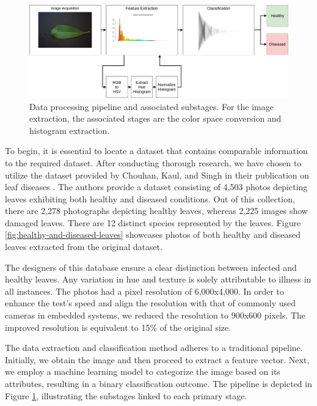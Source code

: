 \begin{figure}[h!]
    \centering
    \includegraphics[width=.9\linewidth]{Figures/pipeline.png}
    \caption{Data processing pipeline and associated substages. For the image extraction, the associated stages are the color space conversion and histogram extraction.}
    \label{fig:pipeline}
\end{figure}

To begin, it is essential to locate a dataset that contains comparable information to the required dataset. After conducting thorough research, we have chosen to utilize the dataset provided by Chouhan, Kaul, and Singh in their publication on leaf diseases \cite{leaf-disease-dataset}. The authors provide a dataset consisting of 4,503 photos depicting leaves exhibiting both healthy and diseased conditions. Out of this collection, there are 2,278 photographs depicting healthy leaves, whereas 2,225 images show damaged leaves. There are 12 distinct species represented by the leaves. Figure \ref{fig:healthy-and-diseased-leaves} showcases photos of both healthy and diseased leaves extracted from the original dataset. 

The designers of this database ensure a clear distinction between infected and healthy leaves. Any variation in hue and texture is solely attributable to illness in all instances. The photos had a pixel resolution of 6,000x4,000. In order to enhance the test's speed and align the resolution with that of commonly used cameras in embedded systems, we reduced the resolution to 900x600 pixels. The improved resolution is equivalent to 15\% of the original size.
	
The data extraction and classification method adheres to a traditional pipeline. Initially, we obtain the image and then proceed to extract a feature vector. Next, we employ a machine learning model to categorize the image based on its attributes, resulting in a binary classification outcome. The pipeline is depicted in Figure \ref{fig:pipeline}, illustrating the substages linked to each primary stage.

